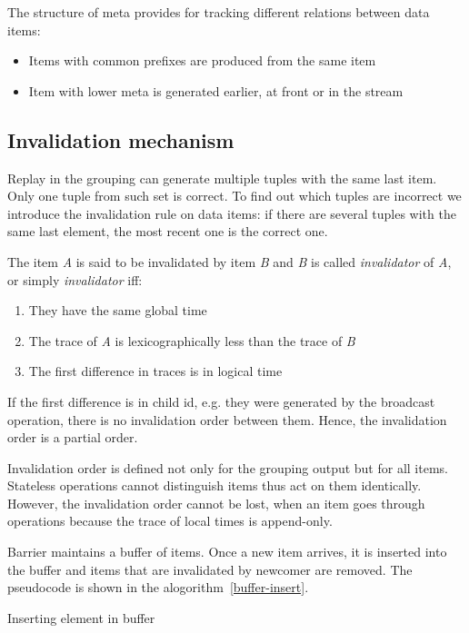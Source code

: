 The structure of meta provides for tracking different relations between data items:

\begin{itemize}
  \item Items with common prefixes are produced from the same item
  \item Item with lower meta is generated earlier, at front or in the stream
\end{itemize}

\subsection{Invalidation mechanism}

Replay in the grouping can generate multiple tuples with the same last item. Only one tuple from such set is correct. To find out which tuples are incorrect we introduce the invalidation rule on data items: if there are several tuples with the same last element, the most recent one is the correct one.

The item {\it A} is said to be invalidated by item {\it B} and {\it B} is called {\it invalidator} of {\it A}, or simply {\it invalidator} iff:

\begin{enumerate}
\item They have the same global time
\item The trace of {\it A} is lexicographically less than the trace of {\it B}
\item The first difference in traces is in logical time
\end{enumerate}

If the first difference is in child id, e.g. they were generated by the broadcast operation, there is no invalidation order between them. Hence, the invalidation order is a partial order. 

Invalidation order is defined not only for the grouping output but for all items. Stateless operations cannot distinguish items thus act on them identically. However, the invalidation order cannot be lost, when an item goes through operations because the trace of local times is append-only.

Barrier maintains a buffer of items. Once a new item arrives, it is inserted into the buffer and items that are invalidated by newcomer are removed. The pseudocode is shown in the alogorithm~\ref{buffer-insert}.

\begin{algorithm}
\caption{Inserting element in buffer}
\label{buffer-insert}
\begin{algorithmic}
        \State {}
      \EndIf
    \EndFor
    \State {}
  \EndFunction
\end{algorithmic}
\end{algorithm}

